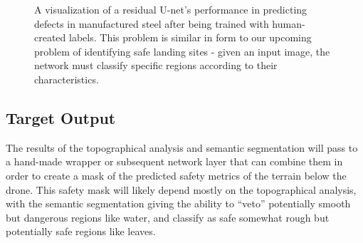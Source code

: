 \begin{figure}
    \caption{A visualization of a residual U-net's performance in predicting defects in manufactured steel after being trained with human-created labels.
    This problem is similar in form to our upcoming problem of identifying safe landing sites - given an input image,
        the network must classify specific regions according to their characteristics.}
    \label{figure:example_steel_prediction}
\end{figure}

\subsection{Target Output}
\label{section:target_output}

The results of the topographical analysis and semantic segmentation will pass to
a hand-made wrapper
or subsequent network layer
that can combine them in order to create a mask of the predicted safety metrics of the terrain below the drone.
This safety mask will likely depend mostly on the topographical analysis, with the semantic segmentation giving the ability
to ``veto'' potentially smooth but dangerous regions like water, and classify as safe somewhat rough but potentially safe regions like leaves.